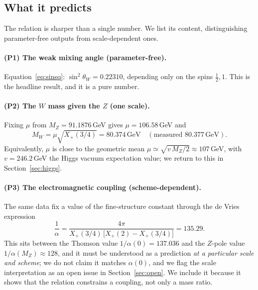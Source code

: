 \documentclass[11pt]{article}
\theoremstyle{plain}
\theoremstyle{definition}
\newcommand{\Xp}{X_{+}}
\newcommand{\half}{\tfrac12}
\newcommand{\sinsq}{\sin^{2}\theta_W}
\begin{document}
\subsection{What it predicts}

The relation is sharper than a single number. We list its content,
distinguishing parameter-free outputs from scale-dependent ones.

\paragraph{(P1) The weak mixing angle (parameter-free).}
Equation~\eqref{eq:sinsq}: $\sinsq=0.22310$, depending only on the spins
$\half,1$. This is the headline result, and it is a pure number.

\paragraph{(P2) The $W$ mass given the $Z$ (one scale).}
Fixing $\mu$ from $M_Z=91.1876\,$GeV gives $\mu=106.58\,$GeV and
\begin{equation}
M_W=\mu\sqrt{\Xp(3/4)}=80.374\,\text{GeV}
\quad(\text{measured }80.377\,\text{GeV}).
\end{equation}
Equivalently, $\mu$ is close to the geometric mean
$\mu\simeq\sqrt{v\,M_Z/2}\approx107\,$GeV, with $v=246.2\,$GeV the Higgs
vacuum expectation value; we return to this in Section~\ref{sec:higgs}.

\paragraph{(P3) The electromagnetic coupling (scheme-dependent).}
The same data fix a value of the fine-structure constant through the de
Vries expression
\begin{equation}
\frac1\alpha
=\frac{4\pi}{\Xp(3/4)\,\bigl[\Xp(2)-\Xp(3/4)\bigr]}
=135.29 .
\label{eq:alpha}
\end{equation}
This sits between the Thomson value $1/\alpha(0)=137.036$ and the
$Z$-pole value $1/\alpha(M_Z)\approx128$, and it must be understood as a
prediction \emph{at a particular scale and scheme}; we do not claim it
matches $\alpha(0)$, and we flag the scale interpretation as an open issue
in Section~\ref{sec:open}. We include it because it shows that the relation
constrains a coupling, not only a mass ratio.
\end{document}
